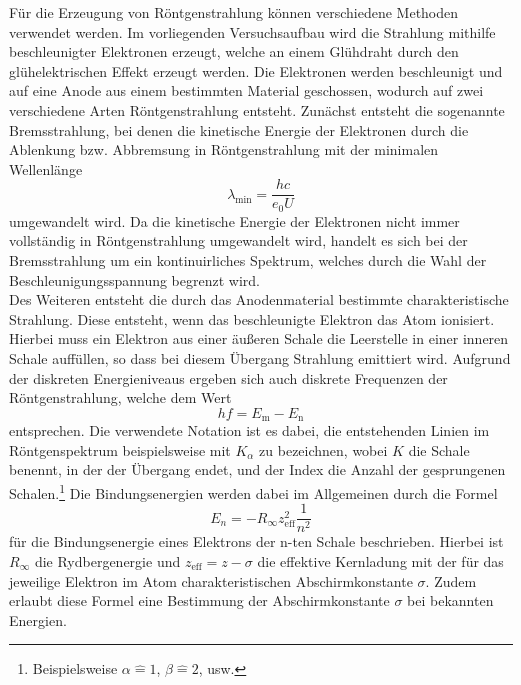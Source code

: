 Für die Erzeugung von Röntgenstrahlung können verschiedene Methoden verwendet werden.
Im vorliegenden Versuchsaufbau wird die Strahlung mithilfe beschleunigter Elektronen erzeugt, welche an einem Glühdraht durch den glühelektrischen Effekt erzeugt werden.
Die Elektronen werden beschleunigt und auf eine Anode aus einem bestimmten Material geschossen, wodurch auf zwei verschiedene Arten Röntgenstrahlung entsteht.
Zunächst entsteht die sogenannte Bremsstrahlung, bei denen die kinetische Energie der Elektronen durch die Ablenkung bzw. Abbremsung in Röntgenstrahlung mit der minimalen Wellenlänge
\begin{equation}
  \lambda_{\text{min}} = \frac{h c}{e_0 U}
  \label{eqn:l}
\end{equation}
umgewandelt wird.
Da die kinetische Energie der Elektronen nicht immer vollständig in Röntgenstrahlung umgewandelt wird, handelt es sich bei der Bremsstrahlung um ein kontinuirliches Spektrum, welches durch die Wahl der Beschleunigungsspannung begrenzt wird.\\
Des Weiteren entsteht die durch das Anodenmaterial bestimmte charakteristische Strahlung.
Diese entsteht, wenn das beschleunigte Elektron das Atom ionisiert.
Hierbei muss ein Elektron aus einer äußeren Schale die Leerstelle in einer inneren Schale auffüllen, so dass bei diesem Übergang Strahlung emittiert wird.
Aufgrund der diskreten Energieniveaus ergeben sich auch diskrete Frequenzen der Röntgenstrahlung, welche dem Wert
\begin{equation}
  h f = E_{\text{m}} - E_{\text{n}}
\end{equation}
entsprechen.
Die verwendete Notation ist es dabei, die entstehenden Linien im Röntgenspektrum beispielsweise mit $K_{\alpha}$ zu bezeichnen, wobei $K$ die Schale benennt, in der der Übergang endet, und der Index die Anzahl der gesprungenen Schalen.\footnote{Beispielsweise $\alpha \hat{=} 1$, $\beta \hat{=} 2$, usw.}
Die Bindungsenergien werden dabei im Allgemeinen durch die Formel
\begin{equation}
  E_n = - R_{\infty} z_{\text{eff}}^2 \frac{1}{n^2}
  \label{eqn:std}
\end{equation}
für die Bindungsenergie eines Elektrons der n-ten Schale beschrieben.
Hierbei ist $R_{\infty}$ die Rydbergenergie und $z_{\text{eff}} = z - \sigma$ die effektive Kernladung mit der für das jeweilige Elektron im Atom charakteristischen Abschirmkonstante $\sigma$.
Zudem erlaubt diese Formel eine Bestimmung der Abschirmkonstante $\sigma$ bei bekannten Energien.

